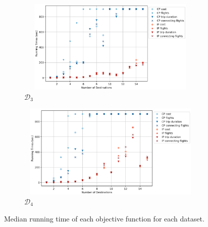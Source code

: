 \documentclass{mpaper}
\begin{document}
\begin{figure}[!ht]
    \centering
    \begin{subfigure}[b]{0.49\textwidth}
        \includegraphics[width=9cm, height = 4.5cm]{cpipexperiments/cpipopt_d.png}
        \caption{$\mathcal{D}_3$}
        \label{fig:cpipopt_d}
    \end{subfigure}
    \begin{subfigure}[b]{0.49\textwidth}
        \includegraphics[width=9cm, height = 4.5cm]{cpipexperiments/cpipopt_d2.png}
        \caption{$\mathcal{D}_4$}
        \label{fig:cpipopt_d2}
    \end{subfigure}
    \caption{Median running time of each objective function for each dataset.}
    \label{cpipopt}
\end{figure}
\end{document}
